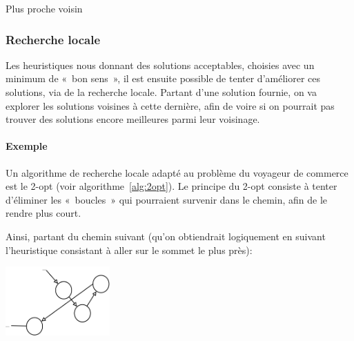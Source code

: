     \begin{algorithm}
      \label{alg:voisin}
      \caption{Plus proche voisin}
    \end{algorithm}

  \subsubsection{Recherche locale}
    Les heuristiques nous donnant des solutions acceptables, choisies avec un
    minimum de «~bon sens~», il est ensuite possible de tenter d'améliorer
    ces solutions, via de la recherche locale.
    Partant d'une solution fournie, on va explorer les solutions voisines
    à cette dernière, afin de voire si on pourrait pas trouver des solutions
    encore meilleures parmi leur voisinage.

    \paragraph{Exemple} Un algorithme de recherche locale adapté au problème
    du voyageur de commerce est le 2-opt (voir algorithme~\ref{alg:2opt}).
    Le principe du 2-opt consiste à tenter d'éliminer les «~boucles~» qui
    pourraient survenir dans le chemin, afin de le rendre plus court.
    \cite{two_opt}

    Ainsi, partant du chemin suivant (qu'on obtiendrait logiquement en suivant
    l'heuristique consistant à aller sur le sommet le plus près):

    \begin{center}
    \includegraphics[width=0.3\textwidth]{graphes/2opt1.png}
    \end{center}

